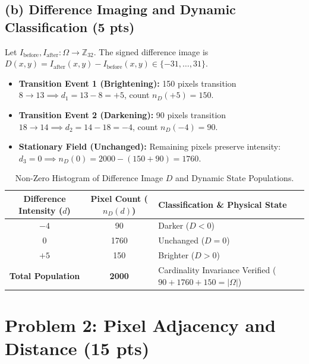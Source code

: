 \documentclass[11pt,a4paper]{article}
\begin{document}
\subsection{(b) Difference Imaging and Dynamic Classification (5 pts)}
Let $I_{\text{before}}, I_{\text{after}}: \Omega \to \mathbb{Z}_{32}$. The signed difference image is $D(x, y) = I_{\text{after}}(x, y) - I_{\text{before}}(x, y) \in \{-31, \dots, 31\}$.
\begin{itemize}
    \item \textbf{Transition Event 1 (Brightening):} 150 pixels transition $8 \to 13 \implies d_1 = 13 - 8 = +5$, count $n_D(+5) = 150$.
    \item \textbf{Transition Event 2 (Darkening):} 90 pixels transition $18 \to 14 \implies d_2 = 14 - 18 = -4$, count $n_D(-4) = 90$.
    \item \textbf{Stationary Field (Unchanged):} Remaining pixels preserve intensity:
    $d_3 = 0 \implies n_D(0) = 2000 - (150 + 90) = 1760$.
\end{itemize}

\begin{table}[htbp]
\centering
\small
\caption{Non-Zero Histogram of Difference Image $D$ and Dynamic State Populations.}
\label{tab:p1_diff_hist}
\begin{tabular}{ccl}
\toprule
\textbf{Difference Intensity ($d$)} & \textbf{Pixel Count ($n_D(d)$)} & \textbf{Classification \& Physical State} \\
\midrule
$-4$ & 90   & Darker ($D < 0$) \\
$0$  & 1760 & Unchanged ($D = 0$) \\
$+5$ & 150  & Brighter ($D > 0$) \\
\midrule
\textbf{Total Population} & \textbf{2000} & Cardinality Invariance Verified ($90 + 1760 + 150 = |\Omega|$) \\
\bottomrule
\end{tabular}
\end{table}

\section{Problem 2: Pixel Adjacency and Distance (15 pts)}
\end{document}

